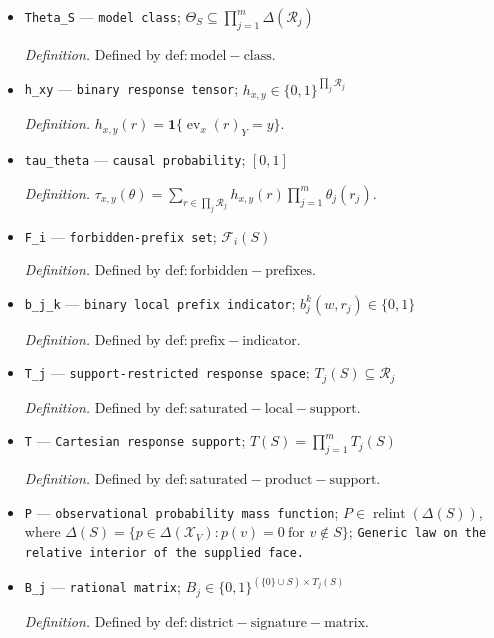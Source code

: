 \documentclass{article}
\begin{document}
\begin{itemize}
  \item \texttt{Theta\_\allowbreak{}S} --- \texttt{model class}; \(\Theta_S\subseteq\prod_{j=1}^m\Delta(\mathcal R_j)\)
  \par\smallskip\noindent\emph{Definition.} Defined by \(\mathrm{def:model-class}\).
  \item \texttt{h\_\allowbreak{}xy} --- \texttt{binary response tensor}; \(h_{x,y}\in\{0,1\}^{\prod_j\mathcal R_j}\)
  \par\smallskip\noindent\emph{Definition.} \(h_{x,y}(r)=\mathbf 1\{\operatorname{ev}_x(r)_Y=y\}\).
  \item \texttt{tau\_\allowbreak{}theta} --- \texttt{causal probability}; \([0,1]\)
  \par\smallskip\noindent\emph{Definition.} \(\tau_{x,y}(\theta)=\sum_{r\in\prod_j\mathcal R_j}h_{x,y}(r)\prod_{j=1}^m\theta_j(r_j)\).
  \item \texttt{F\_\allowbreak{}i} --- \texttt{forbidden-\allowbreak{}prefix set}; \(\mathcal F_i(S)\)
  \par\smallskip\noindent\emph{Definition.} Defined by \(\mathrm{def:forbidden-prefixes}\).
  \item \texttt{b\_\allowbreak{}j\_\allowbreak{}k} --- \texttt{binary local prefix indicator}; \(b_j^k(w,r_j)\in\{0,1\}\)
  \par\smallskip\noindent\emph{Definition.} Defined by \(\mathrm{def:prefix-indicator}\).
  \item \texttt{T\_\allowbreak{}j} --- \texttt{support-\allowbreak{}restricted response space}; \(T_j(S)\subseteq\mathcal R_j\)
  \par\smallskip\noindent\emph{Definition.} Defined by \(\mathrm{def:saturated-local-support}\).
  \item \texttt{T} --- \texttt{Cartesian response support}; \(T(S)=\prod_{j=1}^mT_j(S)\)
  \par\smallskip\noindent\emph{Definition.} Defined by \(\mathrm{def:saturated-product-support}\).
  \item \texttt{P} --- \texttt{observational probability mass function}; \(P\in\operatorname{relint}(\Delta(S))\), where \(\Delta(S)=\{p\in\Delta(\mathcal X_V):p(v)=0\ \text{for }v\notin S\}\); \texttt{Generic law on the relative interior of the supplied face.}
  \item \texttt{B\_\allowbreak{}j} --- \texttt{rational matrix}; \(B_j\in\{0,1\}^{(\{0\}\cup S)\times T_j(S)}\)
  \par\smallskip\noindent\emph{Definition.} Defined by \(\mathrm{def:district-signature-matrix}\).

\end{itemize}
\end{document}
